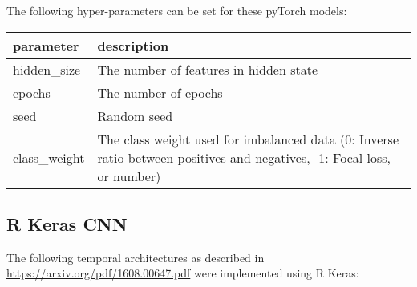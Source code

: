 \documentclass[]{article}
\begin{document}
The following hyper-parameters can be set for these pyTorch models:

\begin{longtable}[]{@{}ll@{}}
\toprule
\begin{minipage}[b]{0.14\columnwidth}\raggedright\strut
parameter\strut
\end{minipage} & \begin{minipage}[b]{0.35\columnwidth}\raggedright\strut
description\strut
\end{minipage}\tabularnewline
\midrule
\endhead
\begin{minipage}[t]{0.14\columnwidth}\raggedright\strut
hidden\_size\strut
\end{minipage} & \begin{minipage}[t]{0.35\columnwidth}\raggedright\strut
The number of features in hidden state\strut
\end{minipage}\tabularnewline
\begin{minipage}[t]{0.14\columnwidth}\raggedright\strut
epochs\strut
\end{minipage} & \begin{minipage}[t]{0.35\columnwidth}\raggedright\strut
The number of epochs\strut
\end{minipage}\tabularnewline
\begin{minipage}[t]{0.14\columnwidth}\raggedright\strut
seed\strut
\end{minipage} & \begin{minipage}[t]{0.35\columnwidth}\raggedright\strut
Random seed\strut
\end{minipage}\tabularnewline
\begin{minipage}[t]{0.14\columnwidth}\raggedright\strut
class\_weight\strut
\end{minipage} & \begin{minipage}[t]{0.35\columnwidth}\raggedright\strut
The class weight used for imbalanced data (0: Inverse ratio between
positives and negatives, -1: Focal loss, or number)\strut
\end{minipage}\tabularnewline
\bottomrule
\end{longtable}

\newpage

\subsection{R Keras CNN}\label{r-keras-cnn}

The following temporal architectures as described in
\url{https://arxiv.org/pdf/1608.00647.pdf} were implemented using R
Keras:
\end{document}
